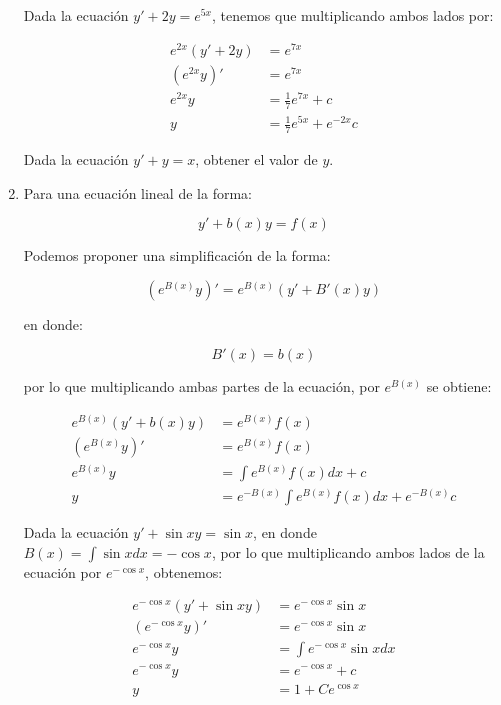 \begin{enumerate}
			\begin{ejemplo}
				Dada la ecuación $y' + 2y = e^{5x}$, tenemos que multiplicando ambos lados por:

				\begin{align*}
					e^{2x}(y' + 2y) &= e^{7x} \\
					(e^{2x} y)' &= e^{7x} \\
					e^{2x} y &= \frac{1}{7} e^{7x} + c \\
					y &= \frac{1}{7} e^{5x} + e^{-2x} c
				\end{align*}
			\end{ejemplo}

			\begin{ejercicio}
				Dada la ecuación $y' + y = x$, obtener el valor de $y$.
			\end{ejercicio}

			\item Para una ecuación lineal de la forma:

			\begin{equation*}
				y' + b(x) y = f(x)
			\end{equation*}

			Podemos proponer una simplificación de la forma:

			\begin{equation*}
				(e^{B(x)} y)' = e^{B(x)}(y' + B'(x) y)
			\end{equation*}

			en donde:

			\begin{equation*}
				B'(x) = b(x)
			\end{equation*}

			por lo que multiplicando ambas partes de la ecuación, por $e^{B(x)}$ se obtiene:

			\begin{align*}
				e^{B(x)}(y' + b(x) y) &= e^{B(x)}f(x) \\
				(e^{B(x)} y)' &= e^{B(x)} f(x) \\
				e^{B(x)} y &= \int e^{B(x)} f(x) dx + c \\
				y &= e^{-B(x)} \int e^{B(x)} f(x) dx + e^{-B(x)}c
			\end{align*}

			\begin{ejemplo}
				Dada la ecuación $y' + \sin{x} y = \sin{x}$, en donde $B(x) = \int \sin{x} dx = - \cos{x}$, por lo que multiplicando ambos lados de la ecuación por $e^{-\cos{x}}$, obtenemos:

				\begin{align*}
					e^{-\cos{x}}(y' + \sin{x} y) &= e^{-\cos{x}} \sin{x} \\
					(e^{-\cos{x}} y)' &= e^{-\cos{x}} \sin{x} \\
					e^{-\cos{x}} y &= \int e^{-\cos{x}} \sin{x} dx \\
					e^{-\cos{x}} y &= e^{-\cos{x}} + c \\
					y &= 1 + Ce^{\cos{x}}
				\end{align*}
			\end{ejemplo}


\end{enumerate}

